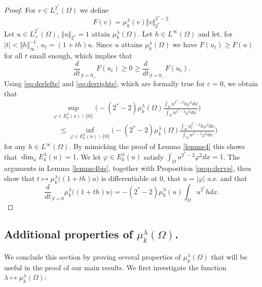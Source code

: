 \documentclass[10pt]{amsart}
\numberwithin{equation}{section}
\newcommand{\ve}{\varepsilon}
\newcommand{\vp}{\varphi}
\newcommand{\Om}{\Omega}
\newcommand{\mkl}{\mu_{k}^{\lambda}}
\theoremstyle{plain}
\theoremstyle{remark}
\begin{document}
  \begin{proof}
For $v \in L^{2^*}_{>}(\Om)$ we define 
\begin{equation*} 
F(v) = \mkl(v) \Vert v \Vert_{2^*}^{2^*-2}.
\end{equation*}
Let $u\in L^{2^*}_{>}(\Om) $,  $\Vert u \Vert_{2^*} = 1$ attain $\mkl(\Om)$. Let $h \in L^\infty(\Om)$ and let, for $|t| < \Vert h \Vert_{\infty}^{-1}$, $u_{t} = (1+th)u$. Since $u$ attains $\mkl(\Om)$ we have $ F(u_{t}) \ge F(u)$ for all $t$ small enough, which implies that
\begin{equation*}
  \frac{d}{dt}_{|t=0_+} F(u_{t})  \ge 0 \ge  \frac{d}{dt}_{|t=0_-} F(u_{t}). 
  \end{equation*}
Using \eqref{eq:derlefte} and \eqref{eq:derrighte}, which are formally true for $\ve = 0$, we obtain that 
\begin{equation*}
\begin{aligned}
&  \sup_{\vp \in E_k^{\lambda}(u)\backslash \{0\}} \Bigg( - (2^*-2) \mkl(\Om) \frac{\int_\Om u^{2^*-2}h \vp^2dx}{\int_\Om u^{2^*-2} \vp^2 dx}\Bigg) \\
  & \quad\le  \inf_{\vp \in E_k^{\lambda}(u)\backslash \{0\}} \Bigg( - (2^*-2) \mkl(\Om) \frac{\int_\Om u_\ve^{2^*-2}h \vp^2dx}{\int_\Om u^{2^*-2} \vp^2 dx}\Bigg) 
  \end{aligned} 
  \end{equation*}
for any $h \in L^\infty(\Om)$. By mimicking the proof of Lemma \ref{lemme4} this shows that $\dim_{u} E_k^{\lambda}(u) = 1$. We let $\vp \in E_k^{\lambda}(u)$ satisfy $\int_{\Om} u^{2^*-2} \vp^2 dx = 1$. The arguments in Lemma \ref{lemme4bis}, together with Proposition \ref{prop:dervp}, then show that $t \mapsto \mkl \big((1+th)u \big)$ is differentiable at $0$, that $u = |\vp|$ a.e. and that 
$$ \frac{d}{dt}_{|t=0}  \mkl \big((1+th)u \big) = - (2^*-2) \mkl(u) \int_{\Om} u^{2^*} h dx.$$
  \end{proof}


\subsection{Additional properties of $\mkl(\Om)$.}

We conclude this section by proving several properties of $\mkl(\Om)$ that will be useful in the proof of our main results. We first investigate the function $\lambda \mapsto \mkl(\Om)$:
\end{document}
